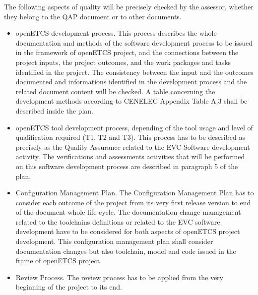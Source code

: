 \documentclass[openetcs]{template/openetcs_article}
\begin{document}
The following aspects of quality will be precisely checked by the assessor, whether they belong to the QAP document or to other documents.
\begin{itemize}
\item openETCS development process. This process describes 
 the whole documentation and methods of the software development process
 to be issued in the framework of openETCS project, and the connections
between the project inputs, the project outcomes, and the work packages and tasks identified in the project. The consistency between the input and the outcomes documented and
informations identified in the development process and the related document content will be checked. A table concerning the development methods according to CENELEC Appendix Table A.3 \cite{EN50128} shall be described inside the plan.
\item openETCS tool development process, depending of the tool usage and level of qualification required (T1, T2 and T3). This process has to be described as
precisely as the Quality Assurance related to the EVC Software development activity. The verifications and assessments activities that will be performed on
this software development process are described in paragraph 5 of the plan.
\item Configuration Management Plan. The Configuration Management Plan has to consider each outcome of the project from its very first release version to end
of the document whole life-cycle. The documentation change management related to the toolchains definitions or related to the EVC software development have
to be considered for both aspects of openETCS project development. This configuration management plan shall consider documentation changes but also toolchain,
model and code issued in the frame of openETCS project.
\item Review Process. The review process has to be applied from the very beginning of the project to its end.
\end{itemize}
\end{document}
